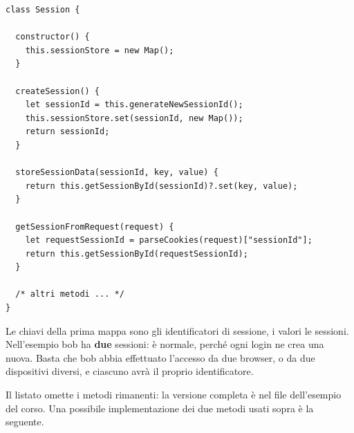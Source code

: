 \begin{affianco}[0.56][c]
\begin{lstlisting}[style=js, name=Session.js]
class Session {

  constructor() {
    this.sessionStore = new Map();
  }

  createSession() {
    let sessionId = this.generateNewSessionId();
    this.sessionStore.set(sessionId, new Map());
    return sessionId;
  }

  storeSessionData(sessionId, key, value) {
    return this.getSessionById(sessionId)?.set(key, value);
  }

  getSessionFromRequest(request) {
    let requestSessionId = parseCookies(request)["sessionId"];
    return this.getSessionById(requestSessionId);
  }

  /* altri metodi ... */
}
\end{lstlisting}
\risultato
\begin{immagine}
\end{immagine}
\end{affianco}

Le chiavi della prima mappa sono gli identificatori di sessione, i valori le
sessioni. Nell'esempio bob ha \textbf{due} sessioni: è normale, perché
ogni login ne crea una nuova. Basta che bob abbia effettuato l'accesso da due
browser, o da due dispositivi diversi, e ciascuno avrà il proprio
identificatore.

Il listato omette i metodi rimanenti: la versione completa è nel file
 dell'esempio del corso. Una possibile implementazione dei due
metodi usati sopra è la seguente.


